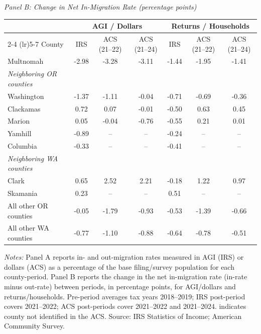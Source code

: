 \begin{table}[htbp]
\begin{threeparttable}
{\begin{tabular}{l*{10}c}
\bottomrule
\end{tabular}%
}
\vspace{1em}
\textit{Panel B: Change in Net In-Migration Rate (percentage points)}
\vspace{0.3em}
{\footnotesize\setlength{\tabcolsep}{4pt}
\begin{tabular}{l*{6}c}
\toprule
 & \multicolumn{3}{c}{AGI / Dollars} & \multicolumn{3}{c}{Returns / Households} \\
\cmidrule(lr){2-4} \cmidrule(lr){5-7}
County & IRS & ACS (21--22) & ACS (21--24) & IRS & ACS (21--22) & ACS (21--24) \\
\midrule
Multnomah & -2.98 & -3.28 & -3.11 & -1.44 & -1.95 & -1.41 \\
\addlinespace
\textit{Neighboring OR counties} & & & & & & \\
\quad Washington & -1.37 & -1.11 & -0.04 & -0.71 & -0.69 & -0.36 \\
\quad Clackamas & 0.72 & 0.07 & -0.01 & -0.50 & 0.63 & 0.45 \\
\quad Marion & 0.05 & -0.04 & -0.76 & -0.55 & 0.21 & 0.01 \\
\quad Yamhill & -0.89 & -- & -- & -0.24 & -- & -- \\
\quad Columbia & -0.33 & -- & -- & -0.41 & -- & -- \\
\addlinespace
\textit{Neighboring WA counties} & & & & & & \\
\quad Clark & 0.65 & 2.52 & 2.21 & -0.18 & 1.22 & 0.97 \\
\quad Skamania & 0.23 & -- & -- & 0.51 & -- & -- \\
\addlinespace
All other OR counties & -0.05 & -1.79 & -0.93 & -0.53 & -1.39 & -0.66 \\
All other WA counties & -0.77 & -1.10 & -0.88 & -0.64 & -0.78 & -0.51 \\
\bottomrule
\end{tabular}%
}
\begin{tablenotes}[flushleft]
\small
\item \textit{Notes:} Panel A reports in- and out-migration rates measured in AGI (IRS) or dollars (ACS) as a percentage of the base filing/survey population for each county-period. Panel B reports the change in the net in-migration rate (in-rate minus out-rate) between periods, in percentage points, for AGI/dollars and returns/households. Pre-period averages tax years 2018--2019; IRS post-period covers 2021--2022; ACS post-periods cover 2021--2022 and 2021--2024.  indicates county not identified in the ACS. Source: IRS Statistics of Income; American Community Survey.
\end{tablenotes}
\end{threeparttable}
\end{table}
